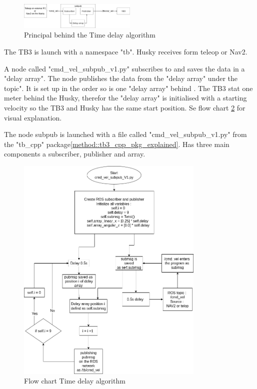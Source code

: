 \begin{figure}[H]
    \centering
    \includegraphics[width = 0.5\textwidth]{Figures/drawio/Time_delay_pricipal.drawio.png}
    \caption{Principal behind the Time delay algorithm}
    \label{fig:TimeDelayPrincipal}
\end{figure}



The TB3 is launch with a namespace "tb". Husky receives  form teleop or Nav2. 

A node called "cmd\_vel\_subpub\_v1.py" subscribes to  and saves the data in a "delay array". The node publishes the data from the "delay array" under the  topic". It is set up in the order so  is one "delay array" behind . The TB3 stat one meter behind the Husky, therefor the "delay array" is initialised with a starting velocity so the TB3 and Husky has the same start position. Se flow chart \ref{fig:TimeDelayFlow} for visual explanation.

The node subpub is launched with a file called "cmd\_vel\_subpub\_v1.py" from the "tb\_cpp" package\ref{method::tb3_cpp_pkg_explained}. Has three main components a subscriber, publisher and array. 

\begin{figure}[H]
    \centering
    \includegraphics[width = 0.8\textwidth]{Figures/drawio/cmd_vel_subpub.png}
    \caption{Flow chart Time delay algorithm}
    \label{fig:TimeDelayFlow}
\end{figure}

